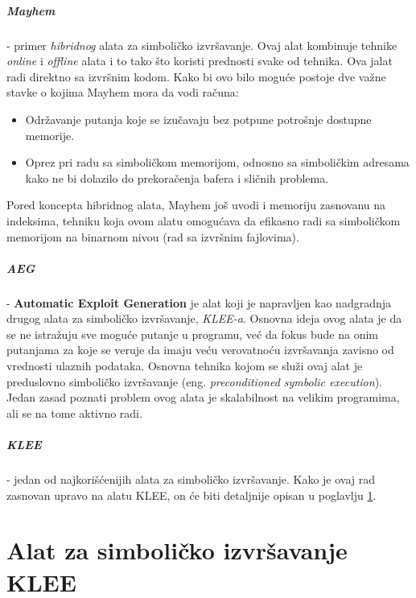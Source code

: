 \documentclass[12pt,oneside]{memoir}
\begin{document}
\paragraph{Mayhem} \cite{mayhem} - primer \textit{hibridnog} alata za simboličko izvršavanje. Ovaj alat kombinuje tehnike \textit{online} i \textit{offline} alata i to tako što koristi prednosti svake od tehnika. Ova jalat radi direktno sa izvršnim kodom. Kako bi ovo bilo moguće postoje dve važne stavke o kojima Mayhem mora da vodi računa:
\begin{itemize}
    \item Održavanje putanja koje se izučavaju bez potpune potrošnje dostupne memorije.
    
    \item Oprez pri radu sa simboličkom memorijom, odnosno sa simboličkim adresama kako ne bi dolazilo do prekoračenja bafera i sličnih problema.
\end{itemize} 
\medskip
Pored koncepta hibridnog alata, Mayhem još uvodi i memoriju zasnovanu na indeksima, tehniku koja ovom alatu omogućava da efikasno radi sa simboličkom memorijom na binarnom nivou (rad sa izvršnim fajlovima).

\paragraph{AEG} \cite{aeg} - \textbf{Automatic Exploit Generation} je alat koji je napravljen kao nadgradnja drugog alata za simboličko izvršavanje, \textit{KLEE-a}\cite{klee}. Osnovna ideja ovog alata je da se ne istražuju sve moguće putanje u programu, već da fokus bude na onim putanjama za koje se veruje da imaju veću verovatnoću izvršavanja zavisno od vrednosti ulaznih podataka. Osnovna tehnika kojom se služi ovaj alat je preduslovno simboličko izvršavanje (eng. \textit{preconditioned symbolic execution}). Jedan zasad poznati problem ovog alata je skalabilnost na velikim programima, ali se na tome aktivno radi.

\paragraph{KLEE} \cite{klee} - jedan od najkorišćenijih alata za simboličko izvršavanje. Kako je ovaj rad zasnovan upravo na alatu KLEE, on će biti detaljnije opisan u poglavlju \ref{KLEE}.

\chapter{Alat za simboličko izvršavanje KLEE} \label{KLEE}
\end{document}
